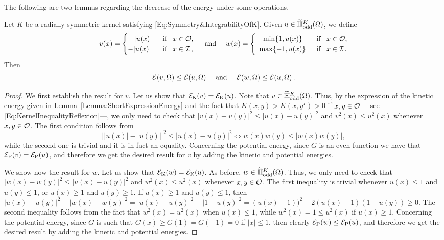 The following are two lemmas regarding the decrease of the energy under some operations.
\begin{lemma}
\label{Lemma:DecreaseEnergy} 
Let $K$ be a radially symmetric kernel satisfying \eqref{Eq:Symmetry&IntegrabilityOfK}. Given $u\in\widetilde{\mathbb{H}}^K_{\mathrm{odd}}(\Omega)$, we define
\begin{equation*}
v(x) = \begin{cases}
\hspace{3.2mm}|u(x)| \,\,\, &\text{if } \,\,\, x\in\mathcal{O},\\
-|u(x)| \,\,\, &\text{if } \,\,\, x\in\mathcal{I}\, ,
\end{cases}
\quad 
\text{ and }
\quad
w(x) = \begin{cases}
\hspace{3.6mm}\min\{1,u(x)\} \,\,\, &\text{if } \,\,\, x\in\mathcal{O},\\
\,\,\,\max\{-1,u(x)\} \,\,\, &\text{if } \,\,\, x\in\mathcal{I}\,.
\end{cases}
\end{equation*}
Then
$$ \mathcal{E}(v,\Omega) \leq \mathcal{E}(u,\Omega) \quad 
\text{ and }
\quad \mathcal{E}(w,\Omega) \leq \mathcal{E}(u,\Omega) \,.  $$
\end{lemma}

\begin{proof}
We first establish the result for $v$. Let us show that  $\mathcal{E}_\mathrm{K}(v) = \mathcal{E}_\mathrm{K}(u)$. Note that $v\in \widetilde{\mathbb{H}}^K_{\mathrm{odd}}(\Omega)$. Thus, by the expression of the kinetic energy given in Lemma~\ref{Lemma:ShortExpressionEnergy} and the fact that $\overline{K}(x,y) > \overline{K}(x,y^\star)> 0$ if $x,y\in \mathcal{O}$ ---see \eqref{Eq:KernelInequalityReflexion}---, we only need to check that $|v(x)-v(y)|^2\leq |u(x)-u(y)|^2$ and $v^2(x)\leq u^2(x)$ whenever $x,y\in\mathcal{O}$. The first condition follows from
$$ \big||u(x)|-|u(y)|\big|^2\leq |u(x)-u(y)|^2 \Longleftrightarrow w(x)w(y) \leq |w(x)w(y)|,  
$$
while the second one is trivial and it is in fact an equality. Concerning the potential energy, since $G$ is an even function we have that $\mathcal{E}_\mathrm{P}(v) = \mathcal{E}_\mathrm{P}(u)$, and therefore we get the desired result for $v$ by adding the kinetic and potential energies.

We show now the result for $w$. Let us show that  $\mathcal{E}_\mathrm{K}(w) = \mathcal{E}_\mathrm{K}(u)$. As before, $w\in \widetilde{\mathbb{H}}^K_{\mathrm{odd}}(\Omega)$. Thus, we only need to check that $|w(x)-w(y)|^2\leq |u(x)-u(y)|^2$ and $w^2(x) \leq u^2(x)$ whenever $x,y\in\mathcal{O}$. The first inequality is trivial whenever $u(x)\leq 1$ and $u(y)\leq 1$, or $u(x)\geq 1$ and $u(y)\geq 1$. If $u(x)\geq 1$ and $u(y)\leq 1$, then $ |u(x)-u(y)|^2-|w(x)-w(y)|^2 = |u(x)-u(y)|^2-|1-u(y)|^2 = (u(x)-1))^2+2(u(x)-1)(1-u(y)) \geq 0$. The second inequality follows from the fact that $w^2(x) = u^2(x)$ when $u(x)\leq 1$, while $w^2(x) = 1 \leq u^2(x)$ if $u(x)\geq 1$. Concerning the potential energy, since $G$ is such that $G(x)\geq G(1) = G(-1) = 0$ if $|x|\leq 1$, then clearly $\mathcal{E}_\mathrm{P}(w) \leq \mathcal{E}_\mathrm{P}(u)$, and therefore we get the desired result by adding the kinetic and potential energies.
\end{proof}




